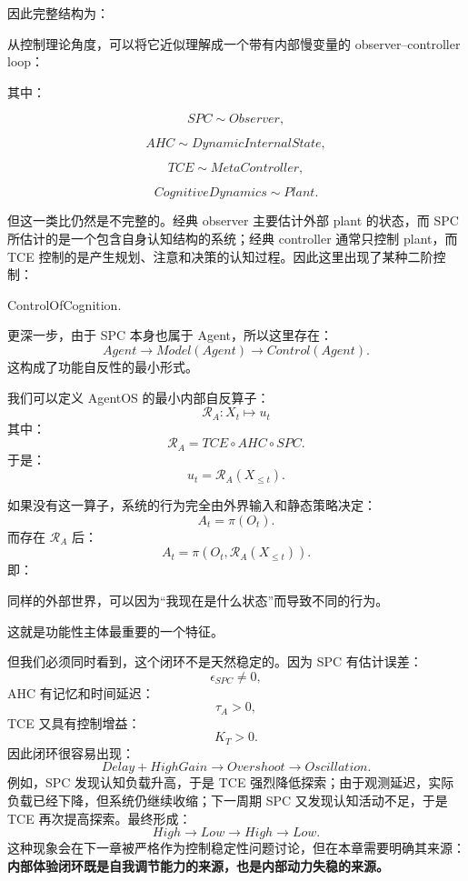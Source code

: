 因此完整结构为：
\begin{statementbox}
\centering
{}
\end{statementbox}

从控制理论角度，可以将它近似理解成一个带有内部慢变量的 observer--controller loop：
\begin{statementbox}
\centering
{}
\end{statementbox}
其中：

\[
SPC\sim Observer,
\]

\[
AHC\sim DynamicInternalState,
\]

\[
TCE\sim MetaController,
\]

\[
CognitiveDynamics\sim Plant.
\]

但这一类比仍然是不完整的。经典 observer 主要估计外部 plant 的状态，而 SPC 所估计的是一个包含自身认知结构的系统；经典 controller 通常只控制 plant，而 TCE 控制的是产生规划、注意和决策的认知过程。因此这里出现了某种二阶控制：

\begin{statementbox}
ControlOfCognition.
\end{statementbox}

更深一步，由于 SPC 本身也属于 Agent，所以这里存在：
\[
Agent
\rightarrow
Model(Agent)
\rightarrow
Control(Agent).
\]
这构成了功能自反性的最小形式。

我们可以定义 AgentOS 的最小内部自反算子：
\[
\mathcal R_A:
X_t
\mapsto
u_t
\]
其中：
\[
\mathcal R_A
=
TCE
\circ
AHC
\circ
SPC.
\]
于是：
\[
\boxed{
u_t
=
\mathcal R_A(X_{\leq t}).
}
\]

如果没有这一算子，系统的行为完全由外界输入和静态策略决定：
\[
A_t=\pi(O_t).
\]
而存在 $\mathcal R_A$ 后：
\[
A_t
=
\pi
\left(
O_t,
\mathcal R_A(X_{\leq t})
\right).
\]
即：
\begin{statementbox}
同样的外部世界，可以因为``我现在是什么状态''而导致不同的行为。
\end{statementbox}

这就是功能性主体最重要的一个特征。

但我们必须同时看到，这个闭环不是天然稳定的。因为 SPC 有估计误差：
\[
\epsilon_{SPC}\neq0,
\]
AHC 有记忆和时间延迟：
\[
\tau_A>0,
\]
TCE 又具有控制增益：
\[
K_T>0.
\]
因此闭环很容易出现：
\[
Delay
+
HighGain
\rightarrow
Overshoot
\rightarrow
Oscillation.
\]
例如，SPC 发现认知负载升高，于是 TCE 强烈降低探索；由于观测延迟，实际负载已经下降，但系统仍继续收缩；下一周期 SPC 又发现认知活动不足，于是 TCE 再次提高探索。最终形成：
\[
High\rightarrow Low\rightarrow High\rightarrow Low.
\]
这种现象会在下一章被严格作为控制稳定性问题讨论，但在本章需要明确其来源：\textbf{内部体验闭环既是自我调节能力的来源，也是内部动力失稳的来源。}

